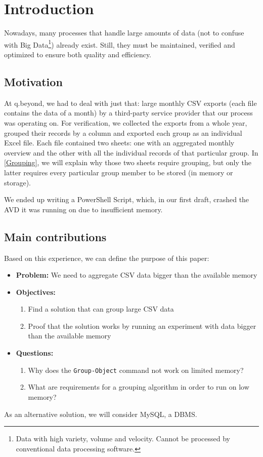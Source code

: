 \setcounter{page}{1}
\pagestyle{fancy}
\fancyhf{}
\fancyhead[R]{\thepage}
\renewcommand{\headrulewidth}{0pt} %

\section{Introduction}
Nowadays, many processes that handle large amounts of data (not to confuse with Big Data\footnote{Data
with high variety, volume and velocity. Cannot be processed by conventional data processing software.})
already exist. Still, they must be maintained, verified and optimized to ensure both
quality and efficiency.

\subsection{Motivation} \label{Motivation}
At q.beyond, we had to deal with just that: large monthly \gls{CSV} exports
(each file contains the data of a month) by a third-party service provider
that our process was operating on. For verification, we collected the exports from a whole year,
grouped their records by a column and exported each group as an individual Excel file.
Each file contained two sheets: one with an aggregated monthly overview and the other with all the
individual records of that particular group.
In \ref{Grouping}, we will explain why those
two sheets require grouping, but only the latter requires every particular group member to be stored
(in memory or storage).

We ended up writing a \gls{PowerShell}
Script, which, in our first draft, crashed the \gls{AVD}
it was running on due to insufficient memory.

\subsection{Main contributions}
Based on this experience, we can define the purpose of this paper:
\begin{itemize}
    \item \textbf{Problem:} We need to aggregate \gls{CSV} data bigger than the available memory
    \item \textbf{Objectives:}
    \begin{enumerate}
        \item Find a solution that can group large \gls{CSV} data
        \item Proof that the solution works by running an
            experiment with data bigger than the available memory
    \end{enumerate}
    \item \textbf{Questions:}
    \begin{enumerate}
        \item Why does the \verb+Group-Object+ command not work on limited memory?
        \item What are requirements for a grouping algorithm in order to run on low memory?
    \end{enumerate}
\end{itemize}
As an alternative solution, we will consider \gls{MySQL}, a \gls{DBMS}.


